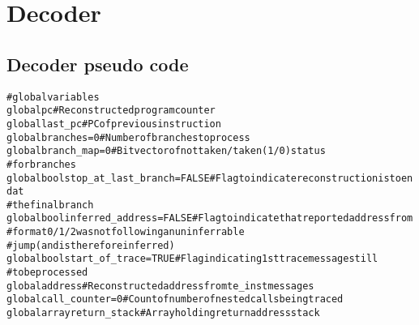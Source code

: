 \chapter{Decoder}

\section{Decoder pseudo code}

\begin{alltt}
# global variables
global       pc                          # Reconstructed program counter
global       last_pc                     # PC of previous instruction
global       branches = 0                # Number of branches to process
global       branch_map = 0              # Bit vector of not taken/taken (1/0) status
                                         #   for branches
global bool  stop_at_last_branch = FALSE # Flag to indicate reconstruction is to end at
                                         #   the final branch
global bool  inferred_address = FALSE    # Flag to indicate that reported address from
                                         #   format 0/1/2 was not following an uninferrable
                                         #     jump (and is therefore inferred)
global bool  start_of_trace = TRUE       # Flag indicating 1st trace message still
                                         #   to be processed
global       address                     # Reconstructed address from te_inst messages
global       call_counter = 0            # Count of number of nested calls being traced
global array return_stack                # Array holding return address stack
\end{alltt}

\pagebreak

